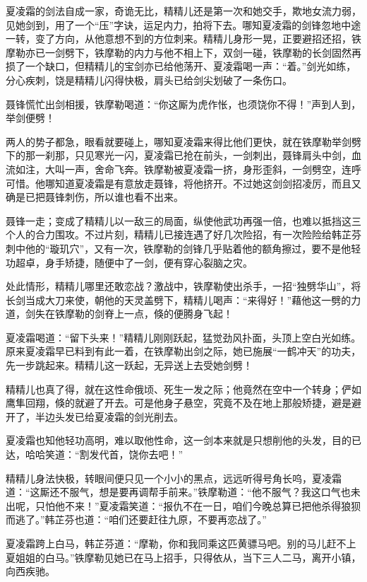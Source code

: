 \documentclass[12pt,oneside]{book}
\begin{document}
夏凌霜的剑法自成一家，奇诡无比，精精儿还是第一次和她交手，欺地女流力弱，见她剑到，用了一个``压''字诀，运足内力，拍将下去。哪知夏凌霜的剑锋忽地中途一转，变了方向，从他意想不到的方位刺来。精精儿身形一晃，正要避招还招，铁摩勒亦已一剑劈下，铁摩勒的内力与他不相上下，双剑一碰，铁摩勒的长剑固然再损了一个缺口，但精精儿的宝剑亦已给他荡开、夏凌霜喝一声：``着。''剑光如练，分心疾刺，饶是精精儿闪得快极，肩头已给剑尖划破了一条伤口。

聂锋慌忙出剑相援，铁摩勒喝道：``你这厮为虎作怅，也须饶你不得！''声到人到，举剑便劈！

两人的势子都急，眼看就要碰上，哪知夏凌霜来得比他们更快，就在铁摩勒举剑劈下的那一刹那，只见寒光一闪，夏凌霜已抢在前头，一剑刺出，聂锋肩头中剑，血流如注，大叫一声，舍命飞奔。铁摩勒被夏凌霜一挤，身形歪斜，一剑劈空，连呼可惜。他哪知道夏凌霜是有意放走聂锋，将他挤开。不过她这剑剑招凌厉，而且又确是已把聂锋刺伤，所以谁也看不出来。

聂锋一走；变成了精精儿以一敌三的局面，纵使他武功再强一倍，也难以抵挡这三个人的合力围攻。不过片刻，精精儿已接连遇了好几次险招，有一次险险给韩芷芬刺中他的``璇玑穴''，又有一次，铁摩勒的剑锋几乎贴着他的额角擦过，要不是他轻功超卓，身手矫捷，随便中了一剑，便有穿心裂脑之灾。

处此情形，精精儿哪里还敢恋战？激战中，铁摩勒使出杀手，一招``独劈华山''，将长剑当成大刀来使，朝他的天灵盖劈下，精精儿喝声：``来得好！''藉他这一劈的力道，剑失在铁摩勒的剑脊上一点，倏的便腾身飞起！

夏凌霜喝道：``留下头来！''精精儿刚刚跃起，猛觉劲风扑面，头顶上空白光如练。原来夏凌霜早已料到有此一着，在铁摩勒出剑之际，她已施展``一鹤冲天''的功夫，先一步跳起来。精精儿这一跃起，无异送上去受她剑劈！

精精儿也真了得，就在这性命俄顷、死生一发之际；他竟然在空中一个转身；俨如鹰隼回翔，倏的就避了开去。可是他身子悬空，究竟不及在地上那般矫捷，避是避开了，半边头发已给夏凌霜的剑光削去。

夏凌霜也知他轻功高明，难以取他性命，这一剑本来就是只想削他的头发，目的已达，哈哈笑道：``割发代首，饶你去吧！''

精精儿身法快极，转眼间便只见一个小小的黑点，远远听得号角长呜，夏凌霜道：``这厮还不服气，想是要再调帮手前来。''铁摩勒道：``他不服气？我这口气也未出呢，只怕他不来！''夏凌霜笑道：``报仇不在一日，咱们今晚总算已把他杀得狼狈而逃了。''韩芷芬也道：``咱们还要赶往九原，不要再恋战了。''

夏凌霜跨上白马，韩芷芬道：``摩勒，你和我同乘这匹黄骠马吧。别的马儿赶不上夏姐姐的白马。''铁摩勒见她已在马上招手，只得依从，当下三人二马，离开小镇，向西疾驰。
\end{document}
